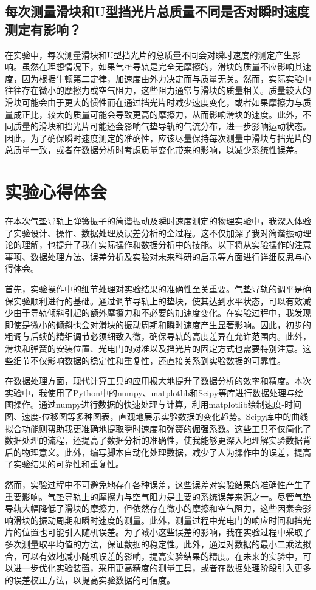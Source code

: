 \documentclass[UTF-8,twoside,cs4size]{ctexart}
\begin{document}
\subsection{每次测量滑块和U型挡光片总质量不同是否对瞬时速度测定有影响？}
{\kaishu 在实验中，每次测量滑块和U型挡光片的总质量不同会对瞬时速度的测定产生影响。虽然在理想情况下，如果气垫导轨是完全无摩擦的，滑块的质量不应影响其速度，因为根据牛顿第二定律，加速度由外力决定而与质量无关。然而，实际实验中往往存在微小的摩擦力或空气阻力，这些阻力通常与滑块的质量相关。质量较大的滑块可能会由于更大的惯性而在通过挡光片时减少速度变化，或者如果摩擦力与质量成正比，较大的质量可能会导致更高的摩擦力，从而影响滑块的速度。此外，不同质量的滑块和挡光片可能还会影响气垫导轨的气流分布，进一步影响运动状态。因此，为了确保瞬时速度测定的准确性，应该尽量保持每次测量中滑块与挡光片的总质量一致，或者在数据分析时考虑质量变化带来的影响，以减少系统性误差。}

\section{实验心得体会}
在本次气垫导轨上弹簧振子的简谐振动及瞬时速度测定的物理实验中，我深入体验了实验设计、操作、数据处理及误差分析的全过程。这不仅加深了我对简谐振动理论的理解，也提升了我在实际操作和数据分析中的技能。以下将从实验操作的注意事项、数据处理方法、误差分析及实验对未来科研的启示等方面进行详细反思与心得体会。

首先，实验操作中的细节处理对实验结果的准确性至关重要。气垫导轨的调平是确保实验顺利进行的基础。通过调节导轨上的垫块，使其达到水平状态，可以有效减少由于导轨倾斜引起的额外摩擦力和不必要的加速度变化。在实验过程中，我发现即使是微小的倾斜也会对滑块的振动周期和瞬时速度产生显著影响。因此，初步的粗调与后续的精细调节必须细致入微，确保导轨的高度差异在允许范围内。此外，滑块和弹簧的安装位置、光电门的对准以及挡光片的固定方式也需要特别注意。这些细节不仅影响数据的稳定性和重复性，还直接关系到实验数据的可靠性。

在数据处理方面，现代计算工具的应用极大地提升了数据分析的效率和精度。本次实验中，我使用了Python中的numpy、matplotlib和Scipy等库进行数据处理与绘图操作。通过numpy进行数据的快速处理与计算，利用matplotlib绘制速度-时间图、速度-位移图等多种图表，直观地展示实验数据的变化趋势。Scipy库中的曲线拟合功能则帮助我更准确地提取瞬时速度和弹簧的倔强系数。这些工具不仅简化了数据处理的流程，还提高了数据分析的准确性，使我能够更深入地理解实验数据背后的物理意义。此外，编写脚本自动化处理数据，减少了人为操作中的误差，提高了实验结果的可靠性和重复性。

然而，实验过程中不可避免地存在各种误差，这些误差对实验结果的准确性产生了重要影响。气垫导轨上的摩擦力与空气阻力是主要的系统误差来源之一。尽管气垫导轨大幅降低了滑块的摩擦力，但依然存在微小的摩擦和空气阻力，这些因素会影响滑块的振动周期和瞬时速度的测量。此外，测量过程中光电门的响应时间和挡光片的位置也可能引入随机误差。为了减小这些误差的影响，我在实验过程中采取了多次测量取平均值的方法，保证数据的稳定性。此外，通过对数据的最小二乘法拟合，可以有效地减小随机误差的影响，提高实验结果的精度。在未来的实验中，可以进一步优化实验装置，采用更高精度的测量工具，或者在数据处理阶段引入更多的误差校正方法，以提高实验数据的可信度。
\end{document}
